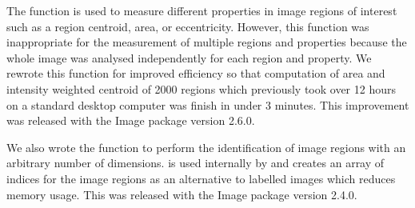 The function  is used to measure different
properties in image regions of interest such as a region centroid,
area, or eccentricity.  However, this function was inappropriate for
the measurement of multiple regions and properties because the whole
image was analysed independently for each region and property.  We rewrote
this function for improved efficiency so that
computation of area and intensity weighted
centroid of 2000 regions which previously took over 12 hours on a
standard desktop computer was finish in under 3 minutes.
This improvement was released with the Image package version 2.6.0.

We also wrote the function  to perform the
identification of image regions with an arbitrary number of
dimensions.
 is used internally by  and
creates an array of indices for the image regions as an
alternative to labelled images which reduces memory usage.
This was released with the Image
package version 2.4.0.



